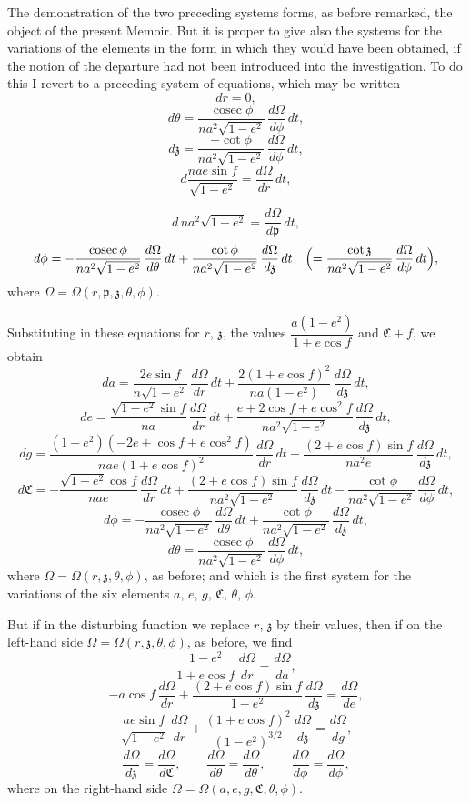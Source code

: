 \documentclass[11pt]{article}
\begin{document}
\medskip
\noindent The demonstration of the two preceding systems forms, as before remarked, the object of the present Memoir. But it is proper to give also the systems for the variations of the elements in the form in which they would have been obtained, if the notion of the departure had not been introduced into the investigation. To do this I revert to a preceding system of equations, which may be written
\[
dr = 0,
\]
\[
d\theta = \frac{\operatorname{cosec}\phi}{na^{2}\sqrt{1-e^{2}}}\,\frac{d\Omega}{d\phi}\,dt,
\]
\[
d\mathfrak{z} = \frac{-\cot\phi}{na^{2}\sqrt{1-e^{2}}}\,\frac{d\Omega}{d\phi}\,dt,
\]
\[
d\frac{nae\sin f}{\sqrt{1-e^{2}}} = \frac{d\Omega}{dr}\,dt,
\]

\bigskip
{}
\[
d\,na^{2}\sqrt{1-e^{2}} = \frac{d\Omega}{d\mathfrak{p}}\,dt,
\]
\[
d\phi = -\frac{\operatorname{cosec}\phi}{na^{2}\sqrt{1-e^{2}}}\,\frac{d\Omega}{d\theta}\,dt + \frac{\cot\phi}{na^{2}\sqrt{1-e^{2}}}\,\frac{d\Omega}{d\mathfrak{z}}\,dt \quad\Bigl(=\frac{\cot\mathfrak{z}}{na^{2}\sqrt{1-e^{2}}}\,\frac{d\Omega}{d\phi}\,dt\Bigr),
\]
where $\Omega = \Omega(r,\mathfrak{p},\mathfrak{z},\theta,\phi)$.

\medskip
\noindent Substituting in these equations for $r$, $\mathfrak{z}$, the values $\dfrac{a(1-e^{2})}{1+e\cos f}$ and $\mathfrak{C}+f$, we obtain
\[
da = \frac{2e\sin f}{n\sqrt{1-e^{2}}}\,\frac{d\Omega}{dr}\,dt + \frac{2(1+e\cos f)^{2}}{na(1-e^{2})}\,\frac{d\Omega}{d\mathfrak{z}}\,dt,
\]
\[
de = \frac{\sqrt{1-e^{2}}\sin f}{na}\,\frac{d\Omega}{dr}\,dt + \frac{e+2\cos f+e\cos^{2}f}{na^{2}\sqrt{1-e^{2}}}\,\frac{d\Omega}{d\mathfrak{z}}\,dt,
\]
\[
dg = \frac{(1-e^{2})(-2e+\cos f + e\cos^{2}f)}{nae(1+e\cos f)^{2}}\,\frac{d\Omega}{dr}\,dt - \frac{(2+e\cos f)\sin f}{na^{2}e}\,\frac{d\Omega}{d\mathfrak{z}}\,dt,
\]
\[
d\mathfrak{C} = -\frac{\sqrt{1-e^{2}}\cos f}{nae}\,\frac{d\Omega}{dr}\,dt + \frac{(2+e\cos f)\sin f}{na^{2}\sqrt{1-e^{2}}}\,\frac{d\Omega}{d\mathfrak{z}}\,dt - \frac{\cot\phi}{na^{2}\sqrt{1-e^{2}}}\,\frac{d\Omega}{d\phi}\,dt,
\]
\[
d\phi = -\frac{\operatorname{cosec}\phi}{na^{2}\sqrt{1-e^{2}}}\,\frac{d\Omega}{d\theta}\,dt + \frac{\cot\phi}{na^{2}\sqrt{1-e^{2}}}\,\frac{d\Omega}{d\mathfrak{z}}\,dt,
\]
\[
d\theta = \frac{\operatorname{cosec}\phi}{na^{2}\sqrt{1-e^{2}}}\,\frac{d\Omega}{d\phi}\,dt,
\]
where $\Omega = \Omega(r,\mathfrak{z},\theta,\phi)$, as before; and which is the first system for the variations of the six elements $a$, $e$, $g$, $\mathfrak{C}$, $\theta$, $\phi$.

\medskip
\noindent But if in the disturbing function we replace $r$, $\mathfrak{z}$ by their values, then if on the left-hand side $\Omega = \Omega(r,\mathfrak{z},\theta,\phi)$, as before, we find
\[
\frac{1-e^{2}}{1+e\cos f}\,\frac{d\Omega}{dr} = \frac{d\Omega}{da},
\]
\[
-a\cos f\,\frac{d\Omega}{dr} + \frac{(2+e\cos f)\sin f}{1-e^{2}}\,\frac{d\Omega}{d\mathfrak{z}} = \frac{d\Omega}{de},
\]
\[
\frac{ae\sin f}{\sqrt{1-e^{2}}}\,\frac{d\Omega}{dr} + \frac{(1+e\cos f)^{2}}{(1-e^{2})^{3/2}}\,\frac{d\Omega}{d\mathfrak{z}} = \frac{d\Omega}{dg},
\]
\[
\frac{d\Omega}{d\mathfrak{z}} = \frac{d\Omega}{d\mathfrak{C}},\qquad \frac{d\Omega}{d\theta} = \frac{d\Omega}{d\theta},\qquad \frac{d\Omega}{d\phi} = \frac{d\Omega}{d\phi},
\]
where on the right-hand side $\Omega = \Omega(a,e,g,\mathfrak{C},\theta,\phi)$.
\end{document}
